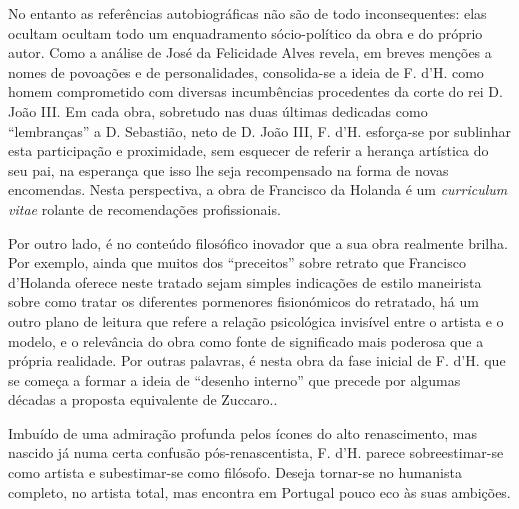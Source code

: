 \documentclass{article}
\begin{document}
No entanto as referências autobiográficas não são de todo
inconsequentes: elas ocultam ocultam todo um enquadramento
sócio-político da obra e do próprio autor. Como a análise de José da
Felicidade Alves revela, em breves menções a nomes de povoações e de
personalidades, consolida-se a ideia de F. d'H. como homem
comprometido com diversas incumbências procedentes da corte do rei
D. João III. Em cada obra, sobretudo nas duas últimas dedicadas como
``lembranças'' a D. Sebastião, neto de D. João III, F. d'H. esforça-se
por sublinhar esta participação e proximidade, sem esquecer de referir
a herança artística do seu pai, na esperança que isso lhe seja
recompensado na forma de novas encomendas. Nesta perspectiva, a obra
de Francisco da Holanda é um \emph{curriculum vitae} rolante de
recomendações profissionais.

Por outro lado, é no conteúdo filosófico inovador que a sua obra
realmente brilha. Por exemplo, ainda que muitos dos ``preceitos''
sobre retrato que Francisco d'Holanda oferece neste tratado sejam
simples indicações de estilo maneirista sobre como tratar os
diferentes pormenores fisionómicos do retratado, há um outro plano de
leitura que refere a relação psicológica invisível entre o artista e o
modelo, e o relevância do obra como fonte de significado mais poderosa
que a própria realidade. Por outras palavras, é nesta obra da fase
inicial de F. d'H. que se começa a formar a ideia de ``desenho
interno'' que precede por algumas décadas a proposta equivalente de
Zuccaro.\cite{holanda-desenho}.

Imbuído de uma admiração profunda pelos ícones do alto renascimento,
mas nascido já numa certa confusão pós-renascentista, F. d'H. parece
sobreestimar-se como artista e subestimar-se como filósofo. Deseja
tornar-se no humanista completo, no artista total, mas encontra em
Portugal pouco eco às suas ambições.

\printbibliography[heading=bibliography,title={Bibliografia}]
\end{document}
